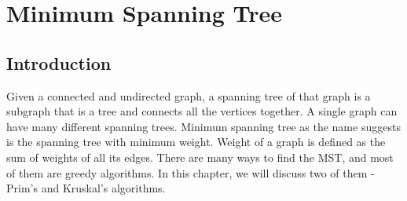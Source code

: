 \chapter{Minimum Spanning Tree}
\section{Introduction}
Given a connected and undirected graph, a spanning tree of that graph is a subgraph that is a tree and connects all the vertices together. A single graph can have many different spanning trees. Minimum spanning tree as the name suggests is the spanning tree with minimum weight. Weight of a graph is defined as the sum of weights of all its edges. There are many ways to find the MST, and most of them are greedy algorithms. In this chapter, we will discuss two of them - Prim's and Kruskal's algorithms.

